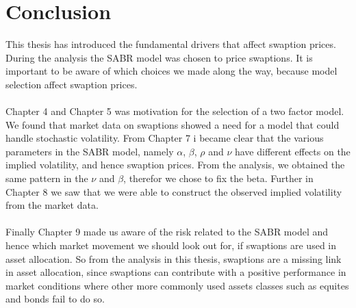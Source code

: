 \section{Conclusion}
This thesis has introduced the fundamental 
drivers that affect swaption prices. 
During the analysis the SABR model was chosen
to price swaptions. It is important to be aware
of which choices we made along the way, 
because model selection affect swaption prices. 
\\\\
Chapter 4 and Chapter 5 was motivation for 
the selection of a two factor model. 
We found that market data on swaptions showed a need
for a model that could handle stochastic 
volatility. From Chapter 7 i became clear 
that the various parameters in the SABR model, 
namely $\alpha$, $\beta$, $\rho$ and $\nu$ 
have different effects on the implied volatility,
and hence swaption prices. 
From the analysis, we obtained the same pattern in 
the $\nu$ and $\beta$, therefor we chose 
to fix the beta. Further in Chapter 8 we saw that we
were able to construct the observed implied volatility
from the market data. 
\\\\
Finally Chapter 9 made us aware
of the risk related to the SABR model and hence which market 
movement we should look out for, if swaptions are used
in asset allocation.  So from the analysis 
in this thesis, swaptions are a missing link in asset 
allocation, since swaptions can contribute with 
a positive performance in market conditions where other more commonly used assets 
classes such as equites and bonds fail to do so.
